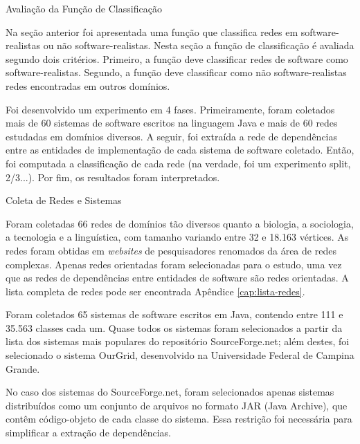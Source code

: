 \begin{section}{Avaliação da Função de Classificação}


Na seção anterior foi apresentada uma função que classifica redes em software-realistas ou não software-realistas. Nesta seção a função de classificação é avaliada segundo dois critérios. Primeiro, a função deve classificar redes de software como software-realistas. Segundo, a função deve classificar como não software-realistas redes encontradas em outros domínios.

Foi desenvolvido um experimento em 4 fases. Primeiramente, foram coletados mais de 60 sistemas de software escritos na linguagem Java e mais de 60 redes estudadas em domínios diversos. A seguir, foi extraída a rede de dependências entre as entidades de implementação de cada sistema de software coletado. Então, foi computada a classificação de cada rede (na verdade, foi um experimento split, 2/3...). Por fim, os resultados foram interpretados.


\begin{subsection}{Coleta de Redes e Sistemas}
	
	Foram coletadas 66 redes de domínios tão diversos quanto a biologia, a sociologia, a tecnologia e a linguística, com tamanho variando entre 32 e 18.163 vértices. As redes foram obtidas em \emph{websites} de pesquisadores renomados da área de redes complexas. Apenas redes orientadas foram selecionadas para o estudo, uma vez que as redes de dependências entre entidades de software são redes orientadas. A lista completa de redes pode ser encontrada Apêndice \ref{cap:lista-redes}.

  Foram coletados 65 sistemas de software escritos em Java, contendo entre 111 e 35.563 classes cada um. Quase todos os sistemas foram selecionados a partir da lista dos sistemas mais populares do repositório SourceForge.net; além destes, foi selecionado o sistema OurGrid, desenvolvido na Universidade Federal de Campina Grande. 

	No caso dos sistemas do SourceForge.net, foram selecionados apenas sistemas distribuídos como um conjunto de arquivos no formato JAR (Java Archive), que contêm código-objeto de cada classe do sistema. Essa restrição foi necessária para simplificar a extração de dependências.


\end{subsection}
\end{section}
